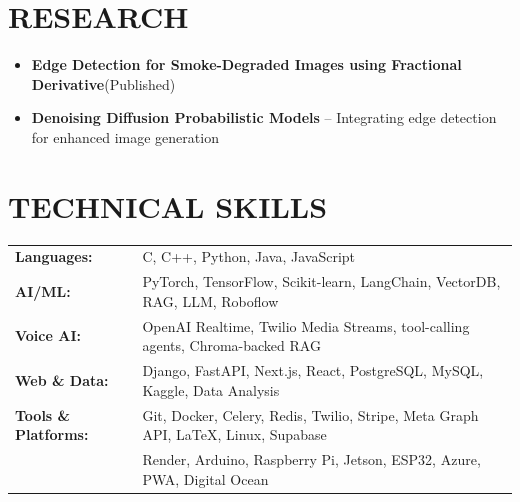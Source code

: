 \documentclass[a4paper,10pt]{article}
\begin{document}
\section*{RESEARCH}
\begin{itemize}
    \item \textbf{Edge Detection for Smoke-Degraded Images using Fractional Derivative}{\color{maincolor}(Published)}
    \item \textbf{Denoising Diffusion Probabilistic Models} -- Integrating edge detection for enhanced image generation
\end{itemize}

\vspace{-0.1cm}

\section*{TECHNICAL SKILLS}
\begin{tabular}{@{}ll@{}}
\textbf{Languages:} & C, C++, Python, Java, JavaScript \\
\textbf{AI/ML:} & PyTorch, TensorFlow, Scikit-learn, LangChain, VectorDB, RAG, LLM, Roboflow \\
\textbf{Voice AI:} & OpenAI Realtime, Twilio Media Streams, tool-calling agents, Chroma-backed RAG \\
\textbf{Web \& Data:} & Django, FastAPI, Next.js, React, PostgreSQL, MySQL, Kaggle, Data Analysis \\
\textbf{Tools \& Platforms:} & Git, Docker, Celery, Redis, Twilio, Stripe, Meta Graph API, LaTeX, Linux, Supabase\\ & Render, Arduino, Raspberry Pi, Jetson, ESP32, Azure, PWA, Digital Ocean
\end{tabular}

\vspace{0.1cm}
\end{document}
